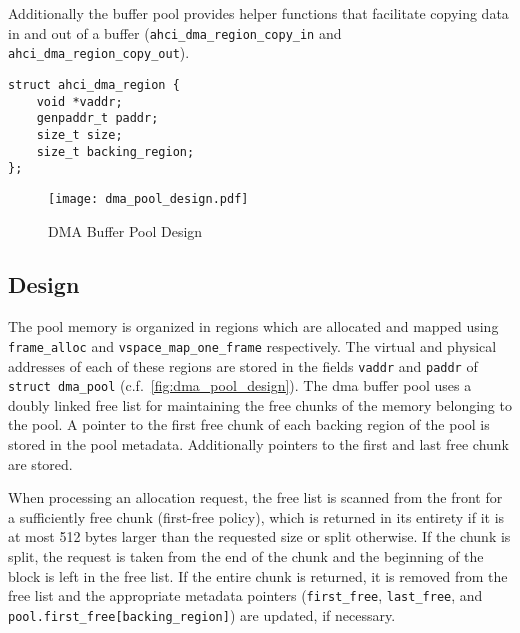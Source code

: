 Additionally the buffer pool provides helper functions that facilitate copying
data in and out of a buffer (\lstinline+ahci_dma_region_copy_in+ and
\lstinline+ahci_dma_region_copy_out+).

\begin{center}
\begin{minipage}{54mm}
\begin{lstlisting}[caption={DMA region handle},label=code:reghandle]
struct ahci_dma_region {
    void *vaddr;
    genpaddr_t paddr;
    size_t size;
    size_t backing_region;
};
\end{lstlisting}
\end{minipage}
\end{center}

\begin{figure}[p]
\centering
\texttt{[image: dma\_pool\_design.pdf]}
\caption{DMA Buffer Pool Design}
\label{fig:dma_pool_design}
\end{figure}

\subsection{Design}

The pool memory is organized in regions which are allocated and mapped using
\linebreak\lstinline+frame_alloc+ and \lstinline+vspace_map_one_frame+
respectively. The virtual and physical addresses of each of these regions are
stored in the fields \lstinline+vaddr+ and \lstinline+paddr+ of
\linebreak\lstinline+struct dma_pool+ (c.f.~\autoref{fig:dma_pool_design}). The
\acs{dma} buffer pool uses a doubly linked free list for maintaining the free
chunks of the memory belonging to the pool.  A pointer to the first free chunk
of each backing region of the pool is stored in the pool metadata. Additionally
pointers to the first and last free chunk are stored.

When processing an allocation request, the free list is scanned from the front
for a sufficiently free chunk (first-free policy), which is returned in its
entirety if it is at most 512 bytes larger than the requested size or split
otherwise. If the chunk is split, the request is taken from the end of the
chunk and the beginning of the block is left in the free list. If the entire
chunk is returned, it is removed from the free list and the appropriate
metadata pointers (\lstinline+first_free+, \lstinline+last_free+, and
\lstinline+pool.first_free[backing_region]+) are updated, if necessary.

